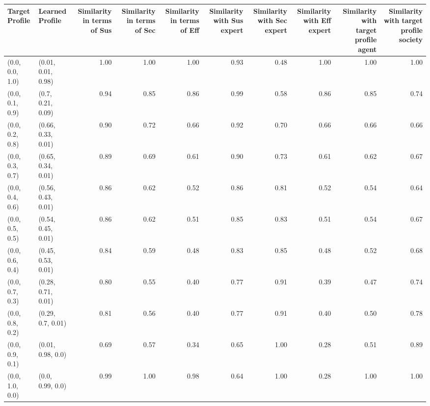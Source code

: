 \begin{tabular}{llrrrrrrrr}
\toprule
Target Profile & Learned Profile & Similarity in terms of Sus & Similarity in terms of Sec & Similarity in terms of Eff & Similarity with Sus expert & Similarity with Sec expert & Similarity with Eff expert & Similarity with target profile agent & Similarity with target profile society \\
\midrule
(0.0, 0.0, 1.0) & (0.01, 0.01, 0.98) & 1.00 & 1.00 & 1.00 & 0.93 & 0.48 & 1.00 & 1.00 & 1.00 \\
(0.0, 0.1, 0.9) & (0.7, 0.21, 0.09) & 0.94 & 0.85 & 0.86 & 0.99 & 0.58 & 0.86 & 0.85 & 0.74 \\
(0.0, 0.2, 0.8) & (0.66, 0.33, 0.01) & 0.90 & 0.72 & 0.66 & 0.92 & 0.70 & 0.66 & 0.66 & 0.66 \\
(0.0, 0.3, 0.7) & (0.65, 0.34, 0.01) & 0.89 & 0.69 & 0.61 & 0.90 & 0.73 & 0.61 & 0.62 & 0.67 \\
(0.0, 0.4, 0.6) & (0.56, 0.43, 0.01) & 0.86 & 0.62 & 0.52 & 0.86 & 0.81 & 0.52 & 0.54 & 0.64 \\
(0.0, 0.5, 0.5) & (0.54, 0.45, 0.01) & 0.86 & 0.62 & 0.51 & 0.85 & 0.83 & 0.51 & 0.54 & 0.67 \\
(0.0, 0.6, 0.4) & (0.45, 0.53, 0.01) & 0.84 & 0.59 & 0.48 & 0.83 & 0.85 & 0.48 & 0.52 & 0.68 \\
(0.0, 0.7, 0.3) & (0.28, 0.71, 0.01) & 0.80 & 0.55 & 0.40 & 0.77 & 0.91 & 0.39 & 0.47 & 0.74 \\
(0.0, 0.8, 0.2) & (0.29, 0.7, 0.01) & 0.81 & 0.56 & 0.40 & 0.77 & 0.91 & 0.40 & 0.50 & 0.78 \\
(0.0, 0.9, 0.1) & (0.01, 0.98, 0.0) & 0.69 & 0.57 & 0.34 & 0.65 & 1.00 & 0.28 & 0.51 & 0.89 \\
(0.0, 1.0, 0.0) & (0.0, 0.99, 0.0) & 0.99 & 1.00 & 0.98 & 0.64 & 1.00 & 0.28 & 1.00 & 1.00 \\
\bottomrule
\end{tabular}

